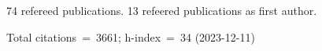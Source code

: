 74 refereed publications. 13 refeered publications as first author.

Total citations~=~3661; h-index~=~34 (2023-12-11)